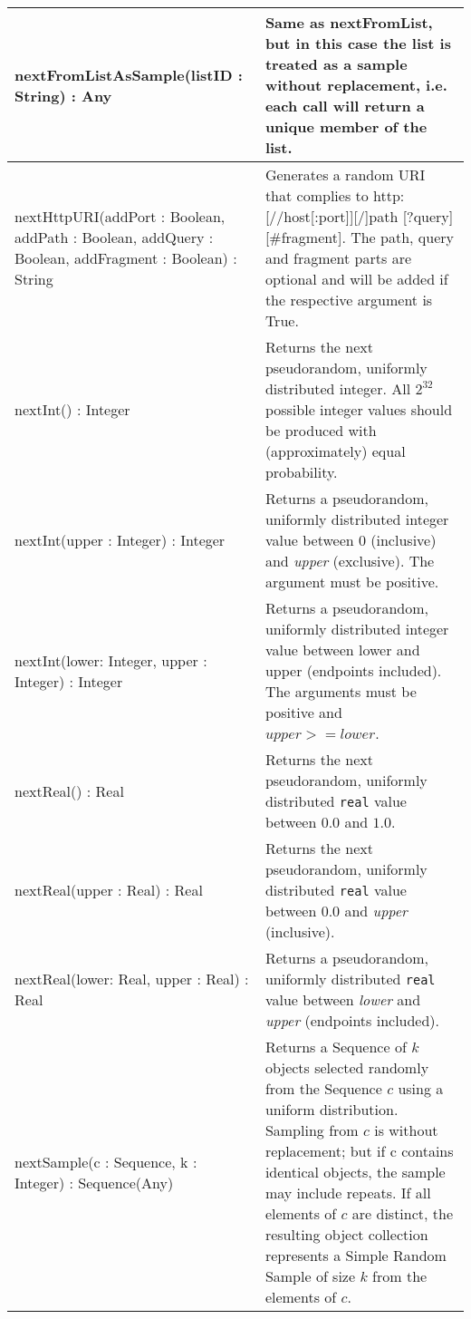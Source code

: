 \begin{longtabu} {|p{6.5cm}|X|}
	nextFromListAsSample(listID : String) : Any & Same as nextFromList, but in this case the list is treated as a sample without replacement, i.e. each call will return a unique member of the list.\\\hline
	
	nextHttpURI(addPort : Boolean, addPath : Boolean, addQuery : Boolean, addFragment : Boolean) : String & Generates a random URI that complies to http:[//host[:port]][/]path [?query][\#fragment]. The path, query and fragment parts are optional and will be added if the respective argument is True.\\\hline
    
    nextInt() : Integer & Returns the next pseudorandom, uniformly distributed integer. All $2^{32}$ possible integer values should be produced with (approximately) equal probability.\\\hline
	
	nextInt(upper : Integer) : Integer & Returns a pseudorandom, uniformly distributed integer value between 0 (inclusive) and \emph{upper} (exclusive). The argument must be positive.\\\hline
	
	nextInt(lower: Integer, upper : Integer) : Integer & Returns a pseudorandom, uniformly distributed integer value between lower and upper (endpoints included). The arguments must be positive and $upper >= lower$.\\\hline
    
    nextReal() : Real & Returns the next pseudorandom, uniformly distributed \texttt{real} value between $0.0$ and $1.0$.\\\hline
    
    nextReal(upper : Real) : Real & Returns the next pseudorandom, uniformly distributed \texttt{real} value between $0.0$ and \emph{upper} (inclusive).\\\hline
    
    nextReal(lower: Real, upper : Real) : Real & Returns a pseudorandom, uniformly distributed \texttt{real} value between \emph{lower} and \emph{upper} (endpoints included).\\\hline
    
	nextSample(c : Sequence, k : Integer) : Sequence(Any) & Returns a Sequence of $k$ objects selected randomly from the Sequence $c$ using a uniform distribution.  Sampling from $c$ is without replacement; but if c contains identical objects, the sample may include repeats. If all elements of $c$ are distinct, the resulting object collection represents a Simple Random Sample of size $k$ from the elements of $c$.\\\hline
	

\end{longtabu}
